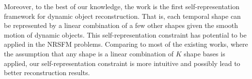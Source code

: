 Moreover, to the best of our knowledge, the work is the first self-representation framework for dynamic object reconstruction. That is, each temporal shape can be represented by a linear combination of a few other shapes given the smooth motion of dynamic objects. This self-representation constraint has potential to be applied in the NRSFM problems. Comparing to most of the existing works, where the assumption that any shape is a linear combination of $K$ shape bases is applied, our self-representation constraint is more intuitive and possibly lead to better reconstruction results.























